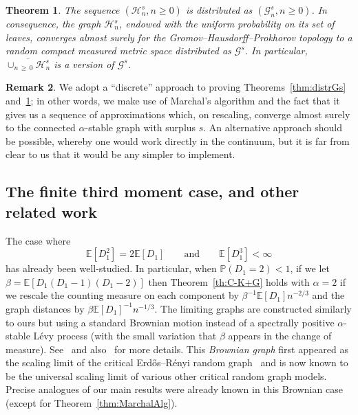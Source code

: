\documentclass[10pt]{amsart}
\newtheorem{theo}{Theorem}[section]
\theoremstyle{definition}\newtheorem{defi}[theo]{Definition}\newtheorem{rema}[theo]{Remark}\newtheorem{exam}[theo]{Example}\newtheorem{exem}[theo]{Example}\newtheorem{nota}[theo]{Notation}
\newcommand{\E}[1]{\ensuremath{\mathbb{E} \left[#1 \right]}}
\newcommand{\cG}{\mathcal{G}}
\newcommand{\cH}{\mathcal{H}}
\newcommand{\bbP}{\mathbb{P}}
\begin{document}


\begin{theo}\label{th:linebreaking}
The sequence $(\cH^s_n, n\geq 0)$ is distributed as $(\cG^s_n, n\geq 0)$. In consequence, the graph $\cH^s_n$, endowed with the uniform probability on its set of leaves, converges almost surely for the Gromov--Hausdorff--Prokhorov topology to a random compact measured metric space distributed as $\cG^s$. In particular, $\overline{\cup_{n\,\geq\,0} \cH^s_{n}}$ is a version of $\cG^s$.
\end{theo}



\begin{rema}
We adopt a ``discrete'' approach to proving Theorems~\ref{thm:distrGs} and~\ref{th:linebreaking}; in other words, we make use of Marchal's algorithm and the fact that it gives us a sequence of approximations which, on rescaling, converge almost surely to the connected $\alpha$-stable graph with surplus $s$. An alternative approach should be possible, whereby one would work directly in the continuum, but it is far from clear to us that it would be any simpler to implement.
\end{rema}

\subsection{The finite third moment case, and other related work}\label{sec:brownian}

The case where
\[
\E{D_1^2}=2 \E{D_1} \qquad \text{and} \qquad \E{D_1^3}<\infty
\]
has already been well-studied. In particular, when $\bbP(D_1 = 2) < 1$, if we let $\beta=\E{D_1(D_1-1)(D_1-2)}$ then Theorem~\ref{th:C-K+G} holds with $\alpha=2$ if we rescale the counting measure on each component by $\beta^{-1} \E{D_1}n^{-2/3} $ and the graph distances by $\beta \E{D_1}^{-1} n^{-1/3}$. The limiting graphs are constructed similarly to ours but using a standard Brownian motion instead of a spectrally positive $\alpha$-stable Lévy process (with the small variation that $\beta$ appears in the change of measure). See~\cite[Theorem~2.4 and Construction~3.5]{BS16+} and also~\cite{CKG17+} for more details. This \emph{Brownian graph} first appeared as the scaling limit of the critical Erd\H{o}s--Rényi random graph~\cite{ABBrGo12} and is now known to be the universal scaling limit of various other critical random graph models. Precise analogues of our main results were already known in this Brownian case (except for Theorem~\ref{thm:MarchalAlg}).
\end{document}
